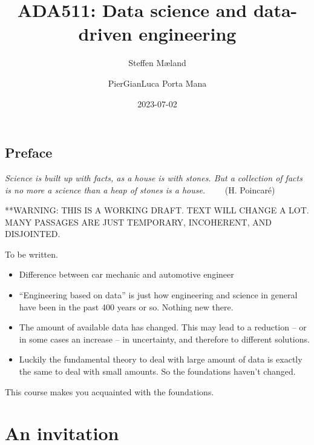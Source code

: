 \documentclass[
  a4paper,
  DIV=11,
  numbers=noendperiod,
  oneside]{scrreprt}
\title{ADA511: Data science and data-driven engineering}
\author{Steffen Mæland \and PierGianLuca Porta Mana}
\date{2023-07-02}
\renewcommand*\contentsname{Table of contents}
\newcommand\contentsname{Table of contents}
\begin{document}
\maketitle
\ifdefined\Shaded\renewenvironment{Shaded}{\begin{tcolorbox}[boxrule=0pt, enhanced, borderline west={3pt}{0pt}{shadecolor}, sharp corners, interior hidden, frame hidden, breakable]}{\end{tcolorbox}}\fi

\renewcommand*\contentsname{Table of contents}
{
\hypersetup{linkcolor=}
\setcounter{tocdepth}{2}
\tableofcontents
}

\hypertarget{preface}{%
\chapter*{Preface}\label{preface}}


\hfill\break
\hfill\break
\hfill\break
\hfill\break
\hfill\break
\hfill\break

\emph{Science is built up with facts, as a house is with stones. But a
collection of facts is no more a science than a heap of stones is a
house.} ~~~~{(H. Poincaré)}

**WARNING: THIS IS A WORKING DRAFT. TEXT WILL CHANGE A LOT. MANY
PASSAGES ARE JUST TEMPORARY, INCOHERENT, AND DISJOINTED.

To be written.

\begin{itemize}
\item
  Difference between car mechanic and automotive engineer
\item
  ``Engineering based on data'' is just how engineering and science in
  general have been in the past 400 years or so. Nothing new there.
\item
  The amount of available data has changed. This may lead to a reduction
  -- or in some cases an increase -- in uncertainty, and therefore to
  different solutions.
\item
  Luckily the fundamental theory to deal with large amount of data is
  exactly the same to deal with small amounts. So the foundations
  haven't changed.
\end{itemize}

This course makes you acquainted with the foundations.

\part{An invitation}
\end{document}
